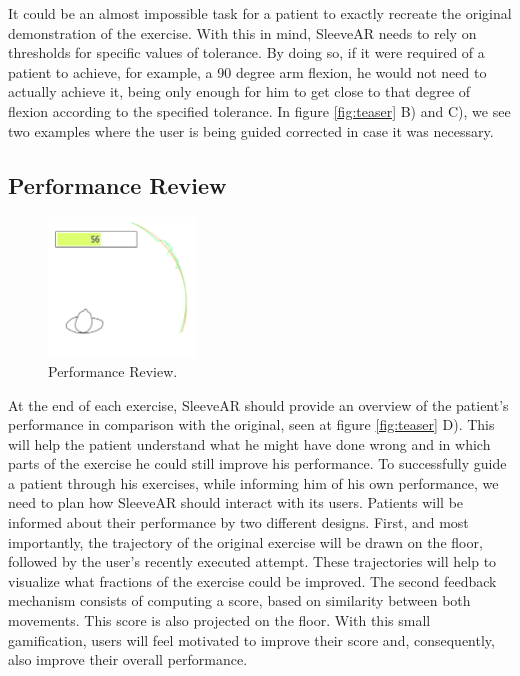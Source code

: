 It could be an almost impossible task for a patient to exactly recreate the original demonstration of the exercise. 
With this in mind, SleeveAR needs to rely on thresholds for specific values of tolerance. 
By doing so, if it were required of a patient to achieve, for example, a 90 degree arm flexion, he would not 
need to actually achieve it, being only enough for him to get close to that degree of flexion according to the specified tolerance.
In figure \ref{fig:teaser} B) and C), we see two examples where the user is being guided corrected in case it was necessary.


\subsection{Performance Review}

\begin{figure}
    \begin{center}
        \includegraphics[width=0.35\textwidth]{imgs/approach/performancereview}
    \end{center}
    \caption{Performance Review.}
    \label{fig:performancereview}
\end{figure}

At the end of each exercise, SleeveAR should provide an overview of the patient's performance in comparison with the original, seen at figure \ref{fig:teaser} D).
This will help the patient understand what he might have done wrong and in which parts of the exercise he could still improve his performance.
To successfully guide a patient through his exercises, while informing him of his own performance, we need to plan how SleeveAR should interact with its users. 
Patients will be informed about their performance by two different designs. 
First, and most importantly, the trajectory of the original exercise will be drawn on the floor, followed by the user's recently executed attempt. 
These trajectories will help to visualize what fractions of the exercise could be improved.
The second feedback mechanism consists of computing a score, based on similarity between both movements. This score is also projected on the floor. 
With this small gamification, users will feel motivated to improve their score and, consequently, also improve their overall performance.

